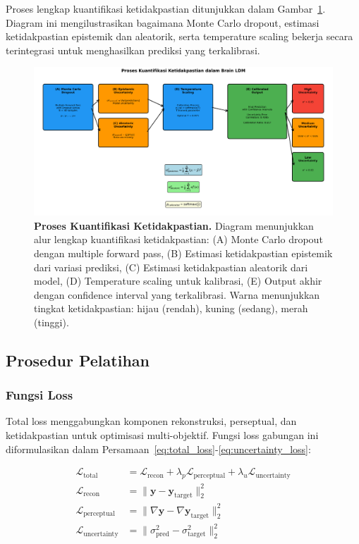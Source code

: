Proses lengkap kuantifikasi ketidakpastian ditunjukkan dalam Gambar~\ref{fig:uncertainty_process}. Diagram ini mengilustrasikan bagaimana Monte Carlo dropout, estimasi ketidakpastian epistemik dan aleatorik, serta temperature scaling bekerja secara terintegrasi untuk menghasilkan prediksi yang terkalibrasi.

\begin{figure}[htbp]
\centering
\includegraphics[width=\textwidth]{../figures/Fig_uncertainty_process.png}
\caption{\textbf{Proses Kuantifikasi Ketidakpastian.} Diagram menunjukkan alur lengkap kuantifikasi ketidakpastian: (A) Monte Carlo dropout dengan multiple forward pass, (B) Estimasi ketidakpastian epistemik dari variasi prediksi, (C) Estimasi ketidakpastian aleatorik dari model, (D) Temperature scaling untuk kalibrasi, (E) Output akhir dengan confidence interval yang terkalibrasi. Warna menunjukkan tingkat ketidakpastian: hijau (rendah), kuning (sedang), merah (tinggi).}
\label{fig:uncertainty_process}
\end{figure}

\subsection{Prosedur Pelatihan}

\subsubsection{Fungsi Loss}
Total loss menggabungkan komponen rekonstruksi, perseptual, dan ketidakpastian untuk optimisasi multi-objektif. Fungsi loss gabungan ini diformulasikan dalam Persamaan~\ref{eq:total_loss}-\ref{eq:uncertainty_loss}:

\begin{align}
\mathcal{L}_{\text{total}} &= \mathcal{L}_{\text{recon}} + \lambda_p \mathcal{L}_{\text{perceptual}} + \lambda_u \mathcal{L}_{\text{uncertainty}} \label{eq:total_loss} \\
\mathcal{L}_{\text{recon}} &= \|\mathbf{y} - \mathbf{y}_{\text{target}}\|_2^2 \label{eq:recon_loss} \\
\mathcal{L}_{\text{perceptual}} &= \|\nabla \mathbf{y} - \nabla \mathbf{y}_{\text{target}}\|_2^2 \label{eq:perceptual_loss} \\
\mathcal{L}_{\text{uncertainty}} &= \|\sigma_{\text{pred}}^2 - \sigma_{\text{target}}^2\|_2^2 \label{eq:uncertainty_loss}
\end{align}

